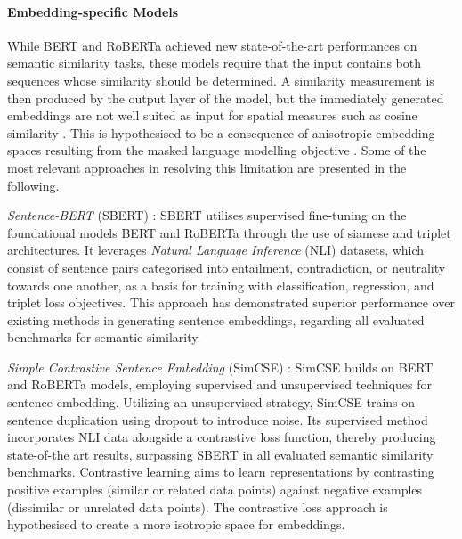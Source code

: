 \documentclass[11pt, numbers=noenddot]{scrreprt}
\let\cite\parencite  %
\begin{document}


\paragraph{Embedding-specific Models} While BERT and RoBERTa achieved new state-of-the-art performances on semantic similarity tasks, these models require that the input contains both sequences whose similarity should be determined. A similarity measurement is then produced by the output layer of the model, but the immediately generated embeddings are not well suited as input for spatial measures such as cosine similarity \cite{reimersSentenceBERTSentenceEmbeddings2019}. This is hypothesised to be a consequence of anisotropic embedding spaces resulting from the masked language modelling objective \cite{liSentenceEmbeddingsPretrained2020}. Some of the most relevant approaches in resolving this limitation are presented in the following.


\textit{Sentence-BERT} (SBERT) \cite{reimersSentenceBERTSentenceEmbeddings2019}: SBERT utilises supervised fine-tuning on the foundational models BERT and RoBERTa through the use of siamese and triplet architectures. It leverages \textit{Natural Language Inference} (NLI) datasets, which consist of sentence pairs categorised into entailment, contradiction, or neutrality towards one another, as a basis for training with classification, regression, and triplet loss objectives. This approach has demonstrated superior performance over existing methods in generating sentence embeddings, regarding all evaluated benchmarks for semantic similarity.

\textit{Simple Contrastive Sentence Embedding} (SimCSE) \cite{gaoSimCSESimpleContrastive2021}:
 SimCSE builds on BERT and RoBERTa models, employing supervised and unsupervised techniques for sentence embedding. Utilizing an unsupervised strategy, SimCSE trains on sentence duplication using dropout to introduce noise. Its supervised method incorporates NLI data alongside a contrastive loss function, thereby producing state-of-the art results, surpassing SBERT in all evaluated semantic similarity benchmarks. Contrastive learning aims to learn representations by contrasting positive examples (similar or related data points) against negative examples (dissimilar or unrelated data points). The contrastive loss approach is hypothesised to create a more isotropic space for embeddings.
\end{document}
